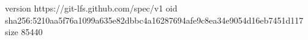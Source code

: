 version https://git-lfs.github.com/spec/v1
oid sha256:5210aa5f76a1099a635e82dbbc4a16287694afe9c8ea34e9054d16eb7451d117
size 85440
